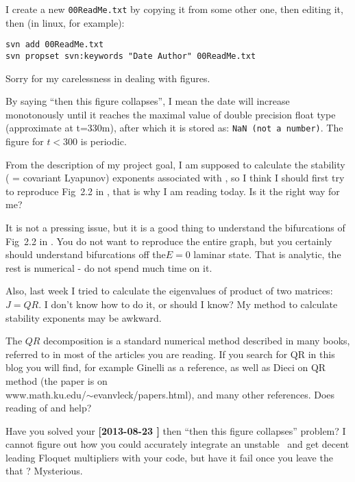 \begin{description}
I create a new \texttt{00ReadMe.txt} by copying it from some other one,
then editing it, then (in linux, for example):
\begin{verbatim}
svn add 00ReadMe.txt
svn propset svn:keywords "Date Author" 00ReadMe.txt
\end{verbatim}

\item[2013-08-23 \XD]
Sorry for my carelessness in dealing with figures.

By saying ``then this figure collapses'', I mean the date will increase
monotonously until it reaches the
maximal value of double precision float type (approximate at t=330m),
after which it is stored as: \texttt{NaN (not a number)}.
The figure for $t<300$ is periodic.

\item[2013-08-26 \XD]
From the description of my project goal, I am supposed to calculate
the stability
( = covariant Lyapunov) exponents associated with \eqva, so I think I
should first try to reproduce Fig~2.2 in , that is why
I am reading  today. Is it the right way for me?

\item[2013-08-27 Predrag] It is not a pressing issue, but it is
 a good thing to understand the bifurcations of Fig~2.2 in
. You do not want to reproduce the entire graph, but
you certainly should understand bifurcations off the$E=0$ laminar state.
That is analytic, the rest is numerical - do not spend much time on
it.

\item[2013-08-26 \XD]
Also, last week I tried to calculate the eigenvalues of product of
two matrices: $J=QR$. I don't know how to do it, or should I know? My
method to calculate stability exponents may be awkward.

\item[2013-08-27 Predrag]
The $QR$ decomposition is a standard numerical method described in
many books, referred to in most of the articles you are reading. If
you search for QR in this blog you will find, for example Ginelli
\etal{} as a reference, as well as Dieci
\etal{} on QR method (the paper is on
\\
{www.math.ku.edu/$\sim$evanvleck/papers.html}), and many other
references. Does reading of
 and  help?


\item[2013-08-27 Predrag]
Have you solved your {\bf [2013-08-23 \XD]} then ``then this
figure collapses'' problem? I cannot figure out how you could
accurately integrate an unstable \po\ and get decent leading Floquet
multipliers with your code, but have it fail once you leave the that
\po? Mysterious.


\end{description}
